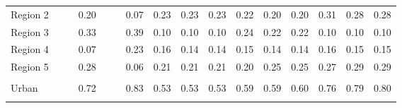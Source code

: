 \begin{tabular}{l*{15}{c}}
Region 2 & & & 0.20 & & & 0.07 & 0.23 & 0.23 & 0.23 & 0.22 & 0.20 & 0.20 & 0.31 & 0.28 & 0.28 \\
Region 3 & & & 0.33 & & & 0.39 & 0.10 & 0.10 & 0.10 & 0.24 & 0.22 & 0.22 & 0.10 & 0.10 & 0.10 \\
Region 4 & & & 0.07 & & & 0.23 & 0.16 & 0.14 & 0.14 & 0.15 & 0.14 & 0.14 & 0.16 & 0.15 & 0.15  \\
Region 5 & & & 0.28 & & & 0.06 & 0.21 & 0.21 & 0.21 & 0.20 & 0.25 & 0.25 & 0.27 & 0.29 & 0.29 \\
\\
Urban & & & 0.72 & & & 0.83 & 0.53 & 0.53 & 0.53 & 0.59 & 0.59 & 0.60 & 0.76 & 0.79 & 0.80 \\
\\
\bottomrule
\end{tabular}